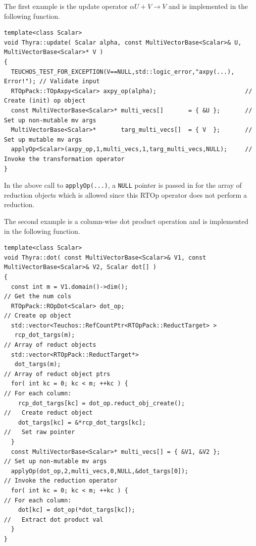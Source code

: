 \documentclass[pdf,ps2pdf,11pt]{SANDreport}
\begin{document}
The first example is the update operator $\alpha U + V \rightarrow V$
and is implemented in the following function.

{\scriptsize\begin{verbatim}
template<class Scalar>
void Thyra::update( Scalar alpha, const MultiVectorBase<Scalar>& U, MultiVectorBase<Scalar>* V )
{
  TEUCHOS_TEST_FOR_EXCEPTION(V==NULL,std::logic_error,"axpy(...), Error!"); // Validate input
  RTOpPack::TOpAxpy<Scalar> axpy_op(alpha);                         // Create (init) op object
  const MultiVectorBase<Scalar>* multi_vecs[]       = { &U };       // Set up non-mutable mv args
  MultiVectorBase<Scalar>*       targ_multi_vecs[]  = { V  };       // Set up mutable mv args
  applyOp<Scalar>(axpy_op,1,multi_vecs,1,targ_multi_vecs,NULL);     // Invoke the transformation operator
}
\end{verbatim}}

{}\noindent{}In the above call to {}\texttt{applyOp(\-...)}, a
{}\texttt{NULL} pointer is passed in for the array of reduction
objects which is allowed since this RTOp operator does not perform a
reduction.

The second example is a column-wise dot product operation and is
implemented in the following function.

{\scriptsize\begin{verbatim}
template<class Scalar>
void Thyra::dot( const MultiVectorBase<Scalar>& V1, const MultiVectorBase<Scalar>& V2, Scalar dot[] )
{
  const int m = V1.domain()->dim();                                      // Get the num cols
  RTOpPack::ROpDot<Scalar> dot_op;                                       // Create op object
  std::vector<Teuchos::RefCountPtr<RTOpPack::ReductTarget> >
   rcp_dot_targs(m);                                                     // Array of reduct objects
  std::vector<RTOpPack::ReductTarget*>
   dot_targs(m);                                                         // Array of reduct object ptrs
  for( int kc = 0; kc < m; ++kc ) {                                      // For each column:
    rcp_dot_targs[kc] = dot_op.reduct_obj_create();                      //   Create reduct object
    dot_targs[kc] = &*rcp_dot_targs[kc];                                 //   Set raw pointer
  }
  const MultiVectorBase<Scalar>* multi_vecs[] = { &V1, &V2 };            // Set up non-mutable mv args
  applyOp(dot_op,2,multi_vecs,0,NULL,&dot_targs[0]);                     // Invoke the reduction operator
  for( int kc = 0; kc < m; ++kc ) {                                      // For each column:
    dot[kc] = dot_op(*dot_targs[kc]);                                    //   Extract dot product val
  }
}
\end{verbatim}}
\end{document}
